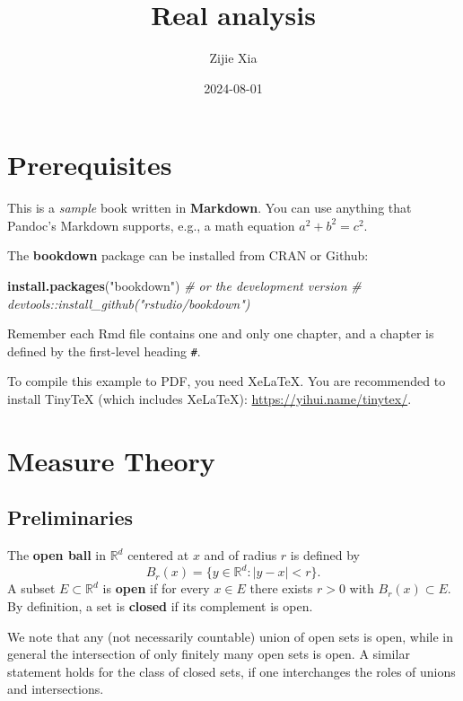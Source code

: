 \documentclass[
]{book}
\title{Real analysis}
\author{Zijie Xia}
\date{2024-08-01}
\newenvironment{Shaded}{\begin{snugshade}}{\end{snugshade}}
\newcommand{\CommentTok}[1]{\textcolor[rgb]{0.56,0.35,0.01}{\textit{#1}}}
\newcommand{\FunctionTok}[1]{\textcolor[rgb]{0.13,0.29,0.53}{\textbf{#1}}}
\newcommand{\NormalTok}[1]{#1}
\newcommand{\StringTok}[1]{\textcolor[rgb]{0.31,0.60,0.02}{#1}}
\theoremstyle{definition}
\theoremstyle{definition}
\theoremstyle{definition}
\theoremstyle{definition}
\theoremstyle{remark}
\begin{document}
\maketitle

{
\setcounter{tocdepth}{1}
\tableofcontents
}
\chapter{Prerequisites}\label{prerequisites}

This is a \emph{sample} book written in \textbf{Markdown}. You can use anything that Pandoc's Markdown supports, e.g., a math equation \(a^2 + b^2 = c^2\).

The \textbf{bookdown} package can be installed from CRAN or Github:

\begin{Shaded}
\begin{Highlighting}[]
\FunctionTok{install.packages}\NormalTok{(}\StringTok{"bookdown"}\NormalTok{)}
\CommentTok{\# or the development version}
\CommentTok{\# devtools::install\_github("rstudio/bookdown")}
\end{Highlighting}
\end{Shaded}

Remember each Rmd file contains one and only one chapter, and a chapter is defined by the first-level heading \texttt{\#}.

To compile this example to PDF, you need XeLaTeX. You are recommended to install TinyTeX (which includes XeLaTeX): \url{https://yihui.name/tinytex/}.

\chapter{Measure Theory}\label{ch1}

\section{Preliminaries}\label{preliminaries}

The \textbf{open ball} in \(\mathbb{R}^d\) centered at \(x\) and of radius \(r\) is defined by
\[
B_r(x)=\{y\in \mathbb{R}^d :|y−x|<r\}.
\]
A subset \(E\subset\mathbb{R}^d\) is \textbf{open} if for every \(x\in E\) there exists \(r>0\) with \(B_r(x)\subset E\). By definition, a set is \textbf{closed} if its complement is open.

We note that any (not necessarily countable) union of open sets is open, while in general the intersection of only finitely many open sets is open. A similar statement holds for the class of closed sets, if one interchanges the roles of unions and intersections.
\end{document}
